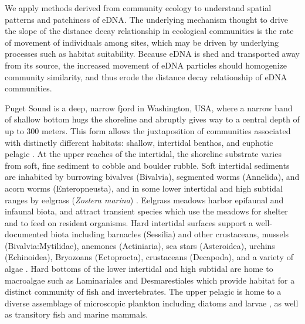 \documentclass[11pt,letterpaper]{article} %
\begin{document}
We apply methods derived from community ecology to understand spatial patterns and patchiness of eDNA. The underlying mechanism thought to drive the slope of the distance decay relationship in ecological communities is the rate of movement of individuals among sites, which may be driven by underlying processes such as habitat suitability. Because eDNA is shed and transported away from its source, the increased movement of eDNA particles should homogenize community similarity, and thus erode the distance decay relationship of eDNA communities.


Puget Sound is a deep, narrow fjord in Washington, USA, where a narrow band of shallow bottom hugs the shoreline and abruptly gives way to a central depth of up to 300 meters. This form allows the juxtaposition of communities associated with distinctly different habitats: shallow, intertidal benthos, and euphotic pelagic \citep{Burns1985}. At the upper reaches of the intertidal, the shoreline substrate varies from soft, fine sediment to cobble and boulder rubble. Soft intertidal sediments are inhabited by burrowing bivalves (Bivalvia), segmented worms (Annelida), and acorn worms (Enteropneusta), and in some lower intertidal and high subtidal ranges by eelgrass (\textit{Zostera marina}) \citep{Kozloff1973, Dethier2010} . Eelgrass meadows harbor epifaunal and infaunal biota, and attract transient species which use the meadows for shelter and to feed on resident organisms. Hard intertidal surfaces support a well-documented biota including barnacles (Sessilia) and other crustaceans, mussels (Bivalvia:Mytilidae), anemones (Actiniaria), sea stars (Asteroidea), urchins (Echinoidea), Bryozoans (Ectoprocta), crustaceans (Decapoda), and a variety of algae \citep{Dethier2010}. Hard bottoms of the lower intertidal and high subtidal are home to macroalgae such as Laminariales and Desmarestiales which provide habitat for a distinct community of fish and invertebrates. The upper pelagic is home to a diverse assemblage of microscopic plankton including diatoms and larvae \citep{Strickland1983}, as well as transitory fish and marine mammals.
\end{document}
